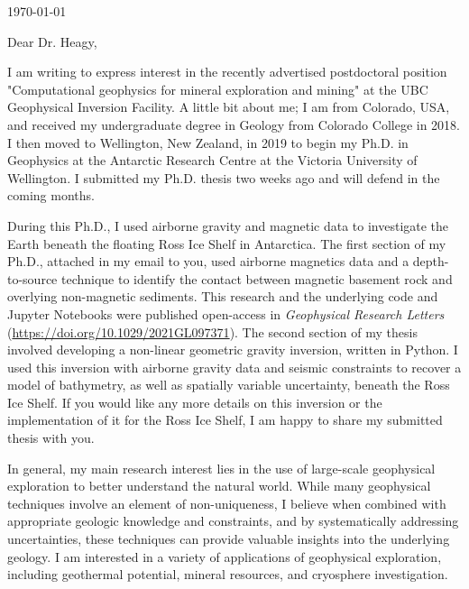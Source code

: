 \documentclass{ExpressiveCoverLetter}
\begin{document}
\coverletterheader[
    firstname=Matthew,
    middleinitial=D,
    lastname=Tankersley,
    email=matt.d.tankersley@gmail.com,
    linkedin=matthew-tankersley,
    github=mdtanker,
]

\vspace{0.25in}
\today
\vspace{0.15in}


Dear Dr. Heagy,

I am writing to express interest in the recently advertised postdoctoral
position "Computational geophysics for mineral exploration and mining" at the
UBC Geophysical Inversion Facility.
A little bit about me; I am from
Colorado, USA, and received my undergraduate degree in Geology from
Colorado College in 2018.
I then moved to Wellington, New Zealand, in
2019 to begin my Ph.D. in Geophysics at the Antarctic Research Centre at the Victoria
University of Wellington.
I submitted my Ph.D. thesis two weeks ago and will defend in the coming months.

During this Ph.D., I used airborne gravity and magnetic data to
investigate the Earth beneath the floating Ross Ice Shelf in Antarctica.
The first section of my Ph.D., attached in my email to
you, used airborne magnetics data and a
depth-to-source technique to identify the contact between magnetic
basement rock and overlying non-magnetic sediments. This research and
the underlying code and Jupyter Notebooks were
published open-access in \textit{Geophysical
    Research Letters} (\url{https://doi.org/10.1029/2021GL097371}).
The second section of my thesis involved developing a non-linear geometric gravity
inversion, written in Python. I used this inversion with airborne gravity data
and seismic constraints to recover a model of bathymetry, as well as spatially variable uncertainty, beneath the
Ross Ice Shelf. If you would like any more details on this inversion or
the implementation of it for the Ross Ice Shelf, I am happy to share my submitted
thesis with you.

In general, my main research interest lies in the use of large-scale geophysical
exploration to better understand the natural world. While many
geophysical techniques involve an element of non-uniqueness, I believe when
combined with appropriate geologic knowledge and constraints, and by
systematically addressing uncertainties, these techniques can provide
valuable insights into the underlying geology. I am interested in a
variety of applications of geophysical exploration, including geothermal potential, mineral
resources, and cryosphere investigation.
\end{document}
